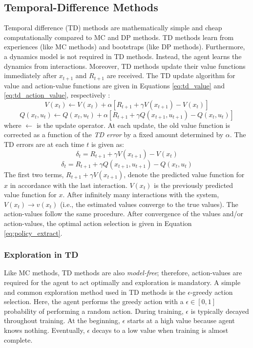\subsection{Temporal-Difference Methods}
Temporal difference (TD) methods are mathematically simple and cheap computationally compared to MC and DP methods. TD methods learn from experiences (like MC methods) and bootstraps (like DP methods). Furthermore, a dynamics model is not required in TD methods. Instead, the agent learns the dynamics from interactions. Moreover, TD methods update their value functions immediately after $x_{t+1}$ and $R_{t+1}$ are received. The TD update algorithm for value and action-value functions are given in Equations \ref{eq:td_value} and \ref{eq:td_action_value}, respectively \cite{td}:
\begin{equation}
    V(x_t) \leftarrow V(x_t) + \alpha \left[R_{t+1} + \gamma V(x_{t+1}) - V(x_t) \right]
    \label{eq:td_value}
\end{equation}
\begin{equation}
    Q(x_t, u_t) \leftarrow Q(x_t, u_t) + \alpha \left[R_{t+1} + \gamma Q(x_{t+1}, u_{t+1}) - Q(x_t, u_t) \right]
    \label{eq:td_action_value}
\end{equation}
where $\leftarrow$ is the update operator. At each update, the old value function is corrected as a function of the \textit{TD error} by a fixed amount determined by $\alpha$.  The TD errors are at each time $t$ is given as:
\begin{equation}
    \delta_t = R_{t+1} + \gamma V(x_{t+1}) - V(x_t)
    \label{eq:01td_error1}
\end{equation}
\begin{equation}
    \delta_t = R_{t+1} + \gamma Q(x_{t+1}, u_{t+1}) - Q(x_t, u_t)
    \label{eq:01td_error2}
\end{equation}
The first two terms, $R_{t+1} + \gamma V(x_{t+1})$, denote the predicted value function for $x$ in accordance with the last interaction.  $V(x_t)$ is the previously predicted value function for $x$. After infinitely many interactions with the system,  $V(x_t) \rightarrow v(x_t)$ (i.e., the estimated values converge to the true values). The action-values follow the same procedure. After convergence of the values and/or action-values, the optimal action selection is given in Equation \ref{eq:policy_extract}.

\subsubsection{Exploration in TD}
Like MC methods, TD methods are also \textit{model-free}; therefore, action-values are required for the agent to act optimally and exploration is mandatory. A simple and common exploration method used in TD methods is the $\epsilon$-greedy action selection. Here, the agent performs the greedy action with a $\epsilon \in [0, 1]$ probability of performing a random action. During training, $\epsilon$ is typically decayed throughout training.  At the beginning, $\epsilon$ starts at a high value because agent knows nothing. Eventually, $\epsilon$ decays to a low value when training is almost complete. 

